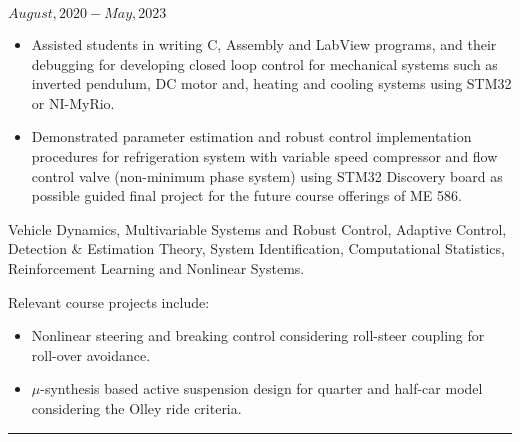 \noindent {} \hfill $August, 2020 - May, 2023$
\begin{itemize}

        \item Assisted students in writing C, Assembly and LabView programs, and their debugging for developing closed loop control for mechanical systems such as inverted pendulum, DC motor and, heating and cooling systems using STM32 or NI-MyRio.

        \item {} Demonstrated parameter estimation and robust control implementation procedures for refrigeration system with variable speed compressor and flow control valve (non-minimum phase system) using STM32 Discovery board as possible guided final project for the future course offerings of ME 586.
\end{itemize}
\medskip
 Vehicle Dynamics, Multivariable Systems and Robust Control, Adaptive Control, Detection \& Estimation Theory, System Identification, Computational Statistics, Reinforcement Learning and Nonlinear Systems.

Relevant course projects include:
\begin{itemize}
        \item Nonlinear steering and breaking control considering roll-steer coupling for roll-over avoidance.
        \item $\mu$-synthesis based active suspension design for quarter and half-car model considering the Olley ride criteria.
\end{itemize}

\noindent\rule{\textwidth}{0.4pt}
